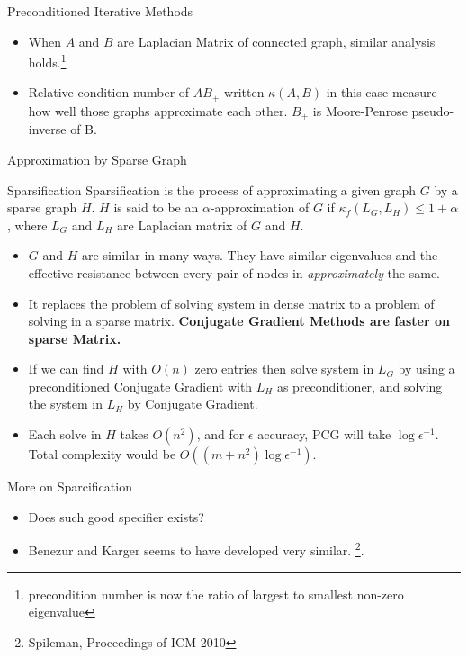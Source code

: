 \documentclass[10pt,sans,serif,trans]{beamer}
\begin{document}
\begin{frame}{Preconditioned Iterative Methods}
   \begin{itemize}
      \item When $A$ and $B$ are Laplacian Matrix of connected graph, similar
analysis holds.\footnote{precondition number is now the ratio of largest to smallest
non-zero eigenvalue}
\item Relative condition number of $AB_+$ written $\kappa(A, B)$ in this case measure how well those
graphs approximate each other. $B_+$ is Moore-Penrose pseudo-inverse of B.
\end{itemize}
\end{frame}

\begin{frame}{Approximation by Sparse Graph}
\begin{block}{Sparsification}
   Sparsification is the process of approximating a given graph $G$ by a sparse graph $H$. $H$ is
said to be an $\alpha$-approximation of $G$ if $\kappa_f(L_G, L_H) \leq 1 + \alpha$, where $L_G$
and $L_H$ are Laplacian matrix of $G$ and $H$.
\end{block}
 
\begin{itemize}
   \item $G$ and $H$ are similar in many ways. They have similar eigenvalues and the effective
resistance between every pair of nodes in \textit{approximately} the same.

\item It replaces the problem of solving system in dense matrix to a problem of solving in a sparse
matrix.\textbf{ Conjugate Gradient Methods are faster on sparse Matrix.}

\item If we can find $H$ with $O(n)$ zero entries then solve system in $L_G$ by using a
preconditioned Conjugate Gradient with $L_H$ as preconditioner, and solving the system in $L_H$ by
Conjugate Gradient.

\item Each solve in $H$ takes $O(n^2)$, and for $\epsilon$ accuracy, PCG will take
$\log{\epsilon^{-1}}$. Total complexity would be $O((m + n^2)\log{\epsilon^{-1}})$. 
\end{itemize}
\end{frame}

\begin{frame}{More on Sparcification}
   \begin{itemize}
      \item Does such good specifier exists?
      \item Benezur and Karger seems to have developed very similar. \footnote{Spileman,
Proceedings of ICM 2010}.
   \end{itemize}
\end{frame}
\end{document}

